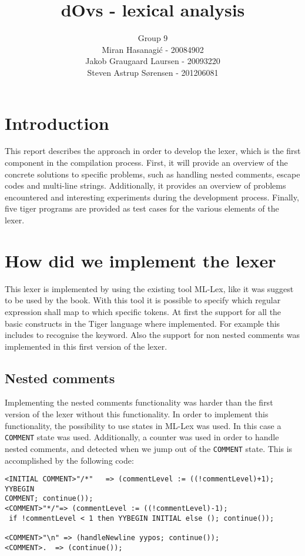 \documentclass{article}
\title{dOvs - lexical analysis}
\author{
  Group 9 \\
  Miran Hasanagi\'{c} - 20084902 \\
  Jakob Graugaard Laursen - 20093220\\
  Steven Astrup S\o rensen - 201206081
}
\begin{document}
\maketitle

\section{Introduction}
This report describes the approach in order to develop the lexer, which is the first component in the compilation process. 
First, it will provide an overview of the concrete solutions to specific problems, such as handling nested comments, escape codes and multi-line strings. 
Additionally, it provides an overview of problems encountered and interesting experiments during the development process. Finally, five tiger programs are provided as test cases for the various elements of the lexer. 

\section{How did we implement the lexer}
This lexer is implemented by using the existing tool ML-Lex, like it was suggest to be used by the book. With this tool it is possible to specify which regular expression shall map to which specific tokens. At first the support for all the basic constructs in the Tiger language where implemented. For example this includes to recognise the keyword. Also the support for non nested comments was implemented in this first version of the lexer. 

\subsection{Nested comments}
Implementing the nested comments functionality was harder than the first version of the lexer without this functionality. In order to implement this functionality, the possibility to use states in ML-Lex was used. In this case a \texttt{COMMENT} state was used. Additionally, a counter was used in order to handle nested comments, and detected when we jump out of the \texttt{COMMENT} state. This is accomplished by the following code:

\begin{lstlisting}[frame=single]
<INITIAL COMMENT>"/*"	=> (commentLevel := ((!commentLevel)+1); YYBEGIN 
COMMENT; continue());
<COMMENT>"*/"=> (commentLevel := ((!commentLevel)-1);
 if !commentLevel < 1 then YYBEGIN INITIAL else (); continue());

<COMMENT>"\n" => (handleNewline yypos; continue());
<COMMENT>.	=> (continue());
\end{lstlisting}
\end{document}
